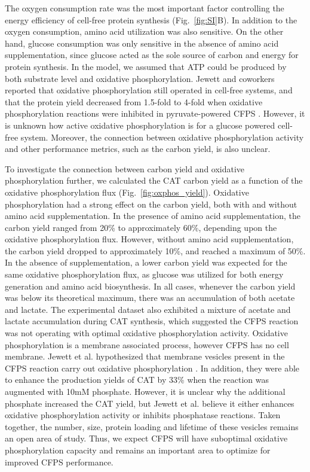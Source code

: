 \documentclass[journal=asbcd6,manuscript=article]{achemso}
\begin{document}

The oxygen consumption rate was the most important factor controlling the energy efficiency of cell-free protein synthesis (Fig.~\ref{fig:SI}B).
In addition to the oxygen consumption, amino acid utilization was also sensitive.
On the other hand, glucose consumption was only sensitive in the absence of amino acid supplementation,
since glucose acted as the sole source of carbon and energy for protein synthesis.
In the model, we assumed that ATP could be produced by both substrate level and oxidative phosphorylation.
Jewett and coworkers reported that oxidative phosphorylation still operated in cell-free systems, and that the protein
yield decreased from 1.5-fold to 4-fold when oxidative phosphorylation reactions were inhibited in pyruvate-powered CFPS \cite{Jewett:2008aa}.
However, it is unknown how active oxidative phosphorylation is for a glucose powered cell-free system.
Moreover, the connection between oxidative phosphorylation activity and other performance metrics, such as the carbon yield, is also unclear.

To investigate the connection between carbon yield and oxidative phosphorylation further,
we calculated the CAT carbon yield as a function of the oxidative phosphorylation flux (Fig.~\ref{fig:oxphos_yield}).
Oxidative phosphorylation had a strong effect on the carbon yield, both with and without amino acid supplementation.
In the presence of amino acid supplementation, the carbon yield ranged from 20\% to approximately 60\%,
depending upon the oxidative phosphorylation flux.
However, without amino acid supplementation, the carbon yield dropped to approximately 10\%, and reached a maximum of 50\%.
In the absence of supplementation, a lower carbon yield was expected for the same oxidative phosphorylation flux, as glucose was utilized for both energy generation and amino acid biosynthesis.
In all cases, whenever the carbon yield was below its theoretical maximum, there was an accumulation of both acetate and lactate.
The experimental dataset also exhibited a mixture of acetate and lactate accumulation during CAT synthesis, which suggested the CFPS reaction was not
operating with optimal oxidative phosphorylation activity.
Oxidative phosphorylation is a membrane associated process, however CFPS has no cell membrane.
Jewett et al. hypothesized that membrane vesicles present in the CFPS reaction carry out oxidative phosphorylation \cite{Jewett:2008aa}.
In addition, they were able to enhance the production yields of CAT by 33\% when the reaction was augmented with 10mM phosphate.
However, it is unclear why the additional phosphate increased the CAT yield, but Jewett et al. believe it either enhances oxidative phosphorylation activity or inhibits phosphatase reactions.
Taken together, the number, size, protein loading and lifetime of these vesicles remains an open area of study.
Thus, we expect CFPS will have suboptimal oxidative phosphorylation capacity and remains an important area to optimize for improved CFPS performance.
\end{document}
